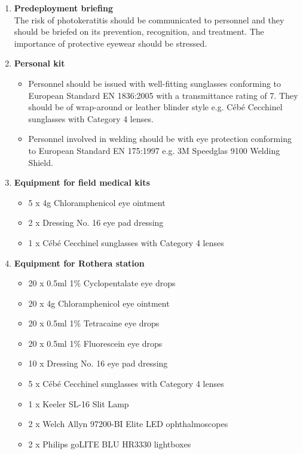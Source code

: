 \documentclass[12pt,a4paper]{article}
\newenvironment{boldenumerate}
    {\begin{enumerate}\renewcommand\labelenumi{\textbf\theenumi}}
    {\end{enumerate}}
\begin{document}
\begin{boldenumerate}
    \item \textbf{Predeployment briefing} \\
    The risk of photokeratitis should be communicated to personnel and they should be briefed on its prevention, recognition, and treatment. The importance of protective eyewear should be stressed.
    \item \textbf{Personal kit}
    \begin{itemize}
        \item Personnel should be issued with well-fitting sunglasses conforming to European Standard EN 1836:2005 with a transmittance rating of 7. They should be of wrap-around or leather blinder style e.g. Cébé Cecchinel sunglasses with Category 4 lenses.
        \item Personnel involved in welding should be with eye protection conforming to European Standard EN 175:1997 e.g. 3M Speedglas 9100 Welding Shield.
    \end{itemize}
    \item \textbf{Equipment for field medical kits}
    \begin{itemize}
        \item 5 x 4g Chloramphenicol eye ointment
        \item 2 x Dressing No. 16 eye pad dressing
        \item 1 x Cébé Cecchinel sunglasses with Category 4 lenses
    \end{itemize}
    \item \textbf{Equipment for Rothera station}
    \begin{itemize}
        \item 20 x 0.5ml 1\% Cyclopentalate eye drops
        \item 20 x 4g Chloramphenicol eye ointment
        \item 20 x 0.5ml 1\% Tetracaine eye drops
        \item 20 x 0.5ml 1\% Fluorescein eye drops
        \item 10 x Dressing No. 16 eye pad dressing
        \item 5 x Cébé Cecchinel sunglasses with Category 4 lenses
        \item 1 x Keeler SL-16 Slit Lamp
        \item 2 x Welch Allyn 97200-BI Elite LED ophthalmoscopes
        \item 2 x Philips goLITE BLU HR3330 lightboxes
    \end{itemize}
\end{boldenumerate}
\end{document}
